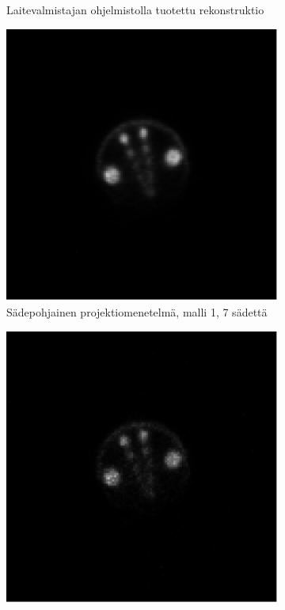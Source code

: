 \begin{figure}[H]
\begin{subfigure}[t]{.25\textwidth}
        \caption{Laitevalmistajan ohjelmistolla tuotettu rekonstruktio}
    \end{subfigure}%
    \hspace{.075\textwidth}%
    \begin{subfigure}[t]{.25\textwidth}
        \includegraphics[width=\linewidth]{kuvat/pro_specta_rekonstruktio_proj1_malli1_nRay7.pdf}
        \caption{Sädepohjainen projektiomenetelmä, malli 1, 7 sädettä}
    \end{subfigure}
    \begin{subfigure}[b]{.25\textwidth}
        \includegraphics[width=\linewidth]{kuvat/pro_specta_rekonstruktio_proj1_malli2_nRay7.pdf}

\end{subfigure}
\end{figure}
